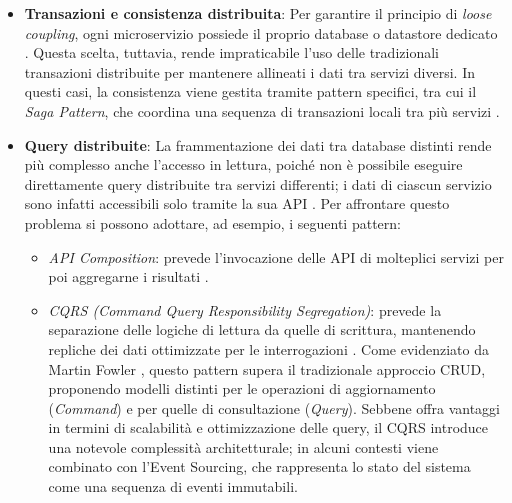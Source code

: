 \begin{itemize}
\begin{itemize}
      comunichino 
      con i servizi interni. Oltre al classico \textbf{API Gateway}, 
      un’evoluzione comune è il pattern \textbf{Backend for Frontend (BFF)}, che prevede un gateway dedicato per ciascuna tipologia di client \cite{Richardson2018}.
    \end{itemize}
    \item \textbf{Transazioni e consistenza distribuita}: Per garantire il principio di \textit{loose coupling}, ogni microservizio possiede il proprio database o datastore dedicato \cite{Richardson2018}. Questa scelta, tuttavia, rende impraticabile l’uso delle tradizionali transazioni distribuite per mantenere allineati i dati tra servizi diversi. In questi casi, la consistenza viene gestita tramite pattern specifici, tra cui il \textit{Saga Pattern}, che coordina una sequenza di transazioni locali tra più servizi \cite{Richardson2018}.
    \item \textbf{Query distribuite}: La frammentazione dei dati tra database distinti rende più complesso anche l’accesso in lettura, poiché non è possibile eseguire direttamente query distribuite tra servizi differenti; i dati di ciascun servizio sono infatti accessibili solo tramite la sua API \cite{Richardson2018}. Per affrontare questo problema si possono adottare, ad esempio, i seguenti pattern:
        \begin{itemize}
          \item \textit{API Composition}: prevede l’invocazione delle API di molteplici servizi per poi aggregarne i risultati \cite{Richardson2018}.
          \item \textit{CQRS (Command Query Responsibility Segregation)}: prevede la separazione delle logiche di lettura da quelle di scrittura, mantenendo repliche dei dati ottimizzate per le interrogazioni \cite{gfg_microservices}. Come evidenziato da Martin Fowler \cite{fowler2011cqrs}, questo pattern supera il tradizionale approccio CRUD, proponendo modelli distinti per le operazioni di aggiornamento (\textit{Command}) e per quelle di consultazione (\textit{Query}). Sebbene offra vantaggi in termini di scalabilità e ottimizzazione delle query, il CQRS introduce una notevole complessità architetturale; in alcuni contesti viene combinato con l’Event Sourcing, che rappresenta lo stato del sistema come una sequenza di eventi immutabili.
        \end{itemize}
        

\end{itemize}
